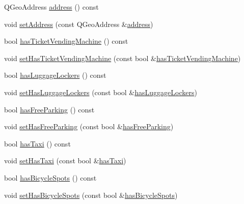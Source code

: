 \begin{DoxyCompactItemize}
\item 
Q\+Geo\+Address \mbox{\hyperlink{classQRail_1_1StationEngine_1_1Station_ad0ca1a356a5b3b97a7f3506a21963a17}{address}} () const
\item 
void \mbox{\hyperlink{classQRail_1_1StationEngine_1_1Station_a186b3fb78bdd5dfbd169ff6d09b55d9a}{set\+Address}} (const Q\+Geo\+Address \&\mbox{\hyperlink{classQRail_1_1StationEngine_1_1Station_ad0ca1a356a5b3b97a7f3506a21963a17}{address}})
\item 
bool \mbox{\hyperlink{classQRail_1_1StationEngine_1_1Station_a686c92468373024b437f0589192668aa}{has\+Ticket\+Vending\+Machine}} () const
\item 
void \mbox{\hyperlink{classQRail_1_1StationEngine_1_1Station_a9791d7b50eed4fad65f2fe5a2ca87876}{set\+Has\+Ticket\+Vending\+Machine}} (const bool \&\mbox{\hyperlink{classQRail_1_1StationEngine_1_1Station_a686c92468373024b437f0589192668aa}{has\+Ticket\+Vending\+Machine}})
\item 
bool \mbox{\hyperlink{classQRail_1_1StationEngine_1_1Station_a09182a137537232a38bc44f00e274355}{has\+Luggage\+Lockers}} () const
\item 
void \mbox{\hyperlink{classQRail_1_1StationEngine_1_1Station_a55fe035b25a59286aa257113c70b6d01}{set\+Has\+Luggage\+Lockers}} (const bool \&\mbox{\hyperlink{classQRail_1_1StationEngine_1_1Station_a09182a137537232a38bc44f00e274355}{has\+Luggage\+Lockers}})
\item 
bool \mbox{\hyperlink{classQRail_1_1StationEngine_1_1Station_adacc2051c657557f3494168e12cd9809}{has\+Free\+Parking}} () const
\item 
void \mbox{\hyperlink{classQRail_1_1StationEngine_1_1Station_a19b10db4449466770ca0a210ef0b400a}{set\+Has\+Free\+Parking}} (const bool \&\mbox{\hyperlink{classQRail_1_1StationEngine_1_1Station_adacc2051c657557f3494168e12cd9809}{has\+Free\+Parking}})
\item 
bool \mbox{\hyperlink{classQRail_1_1StationEngine_1_1Station_a898d71b83cb5deca0f024cbef343c373}{has\+Taxi}} () const
\item 
void \mbox{\hyperlink{classQRail_1_1StationEngine_1_1Station_a50c9fcc45a2f96e58e1058ab6b723dc0}{set\+Has\+Taxi}} (const bool \&\mbox{\hyperlink{classQRail_1_1StationEngine_1_1Station_a898d71b83cb5deca0f024cbef343c373}{has\+Taxi}})
\item 
bool \mbox{\hyperlink{classQRail_1_1StationEngine_1_1Station_adce0ee13730ec3e93866854af6e9048a}{has\+Bicycle\+Spots}} () const
\item 
void \mbox{\hyperlink{classQRail_1_1StationEngine_1_1Station_ac6859b73232d1d6d185fdfe5a6426da7}{set\+Has\+Bicycle\+Spots}} (const bool \&\mbox{\hyperlink{classQRail_1_1StationEngine_1_1Station_adce0ee13730ec3e93866854af6e9048a}{has\+Bicycle\+Spots}})

\end{DoxyCompactItemize}

